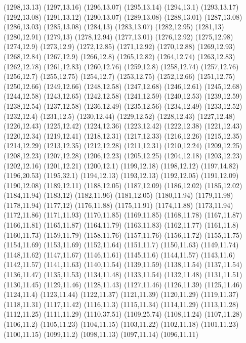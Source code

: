 (1298,13.13)
(1297,13.16)
(1296,13.07)
(1295,13.14)
(1294,13.1)
(1293,13.17)
(1292,13.08)
(1291,13.12)
(1290,13.07)
(1289,13.08)
(1288,13.01)
(1287,13.08)
(1286,13.03)
(1285,13.08)
(1284,13)
(1283,13.07)
(1282,12.95)
(1281,13)
(1280,12.91)
(1279,13)
(1278,12.94)
(1277,13.01)
(1276,12.92)
(1275,12.98)
(1274,12.9)
(1273,12.9)
(1272,12.85)
(1271,12.92)
(1270,12.88)
(1269,12.93)
(1268,12.84)
(1267,12.9)
(1266,12.8)
(1265,12.82)
(1264,12.74)
(1263,12.83)
(1262,12.78)
(1261,12.83)
(1260,12.76)
(1259,12.8)
(1258,12.74)
(1257,12.76)
(1256,12.7)
(1255,12.75)
(1254,12.7)
(1253,12.75)
(1252,12.66)
(1251,12.75)
(1250,12.66)
(1249,12.66)
(1248,12.58)
(1247,12.68)
(1246,12.61)
(1245,12.68)
(1244,12.58)
(1243,12.65)
(1242,12.58)
(1241,12.59)
(1240,12.53)
(1239,12.59)
(1238,12.54)
(1237,12.58)
(1236,12.49)
(1235,12.56)
(1234,12.49)
(1233,12.52)
(1232,12.4)
(1231,12.5)
(1230,12.44)
(1229,12.52)
(1228,12.43)
(1227,12.48)
(1226,12.43)
(1225,12.42)
(1224,12.36)
(1223,12.42)
(1222,12.38)
(1221,12.43)
(1220,12.34)
(1219,12.41)
(1218,12.31)
(1217,12.33)
(1216,12.26)
(1215,12.35)
(1214,12.29)
(1213,12.35)
(1212,12.28)
(1211,12.31)
(1210,12.24)
(1209,12.25)
(1208,12.23)
(1207,12.28)
(1206,12.23)
(1205,12.25)
(1204,12.18)
(1203,12.23)
(1202,12.16)
(1201,12.21)
(1200,12.1)
(1199,12.18)
(1198,12.12)
(1197,14.82)
(1196,20.53)
(1195,32.1)
(1194,12.13)
(1193,12.13)
(1192,12.05)
(1191,12.09)
(1190,12.08)
(1189,12.11)
(1188,12.05)
(1187,12.09)
(1186,12.02)
(1185,12.02)
(1184,11.94)
(1183,12)
(1182,11.96)
(1181,12.05)
(1180,11.94)
(1179,11.98)
(1178,11.94)
(1177,12)
(1176,11.88)
(1175,11.91)
(1174,11.88)
(1173,11.94)
(1172,11.86)
(1171,11.93)
(1170,11.85)
(1169,11.85)
(1168,11.78)
(1167,11.87)
(1166,11.81)
(1165,11.87)
(1164,11.79)
(1163,11.83)
(1162,11.77)
(1161,11.8)
(1160,11.73)
(1159,11.79)
(1158,11.76)
(1157,11.76)
(1156,11.72)
(1155,11.75)
(1154,11.69)
(1153,11.69)
(1152,11.64)
(1151,11.7)
(1150,11.63)
(1149,11.74)
(1148,11.62)
(1147,11.67)
(1146,11.61)
(1145,11.6)
(1144,11.57)
(1143,11.6)
(1142,11.57)
(1141,11.63)
(1140,11.54)
(1139,11.59)
(1138,11.54)
(1137,11.54)
(1136,11.47)
(1135,11.53)
(1134,11.48)
(1133,11.54)
(1132,11.48)
(1131,11.51)
(1130,11.45)
(1129,11.46)
(1128,11.43)
(1127,11.46)
(1126,11.39)
(1125,11.46)
(1124,11.4)
(1123,11.44)
(1122,11.37)
(1121,11.39)
(1120,11.29)
(1119,11.37)
(1118,11.31)
(1117,11.42)
(1116,11.3)
(1115,11.34)
(1114,11.29)
(1113,11.28)
(1112,11.25)
(1111,11.29)
(1110,37.51)
(1109,25.74)
(1108,11.24)
(1107,11.28)
(1106,11.2)
(1105,11.23)
(1104,11.15)
(1103,11.22)
(1102,11.18)
(1101,11.23)
(1100,11.15)
(1099,11.2)
(1098,11.13)
(1097,11.14)
(1096,11.11)

